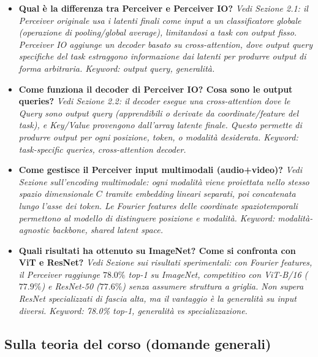\documentclass[
  11pt,
]{article}
\begin{document}
\begin{itemize}
  \item \textbf{Qual è la differenza tra Perceiver e Perceiver IO?}
  \textit{Vedi Sezione 2.1: il Perceiver originale usa i latenti finali come input a un classificatore globale (operazione di pooling/global average), limitandosi a task con output fisso. Perceiver IO aggiunge un decoder basato su cross-attention, dove output query specifiche del task estraggono informazione dai latenti per produrre output di forma arbitraria. Keyword: output query, generalità.}

  \item \textbf{Come funziona il decoder di Perceiver IO? Cosa sono le output queries?}
  \textit{Vedi Sezione 2.2: il decoder esegue una cross-attention dove le Query sono output query (apprendibili o derivate da coordinate/feature del task), e Key/Value provengono dall'array latente finale. Questo permette di produrre output per ogni posizione, token, o modalità desiderata. Keyword: task-specific queries, cross-attention decoder.}

  \item \textbf{Come gestisce il Perceiver input multimodali (audio+video)?}
  \textit{Vedi Sezione sull'encoding multimodale: ogni modalità viene proiettata nello stesso spazio dimensionale $C$ tramite embedding lineari separati, poi concatenata lungo l'asse dei token. Le Fourier features delle coordinate spaziotemporali permettono al modello di distinguere posizione e modalità. Keyword: modalità-agnostic backbone, shared latent space.}

  \item \textbf{Quali risultati ha ottenuto su ImageNet? Come si confronta con ViT e ResNet?}
  \textit{Vedi Sezione sui risultati sperimentali: con Fourier features, il Perceiver raggiunge $78.0\%$ top-1 su ImageNet, competitivo con ViT-B/16 ($77.9\%$) e ResNet-50 ($77.6\%$) senza assumere struttura a griglia. Non supera ResNet specializzati di fascia alta, ma il vantaggio è la generalità su input diversi. Keyword: 78.0\% top-1, generalità vs specializzazione.}

\end{itemize}

\subsection{Sulla teoria del corso (domande generali)}
\end{document}
